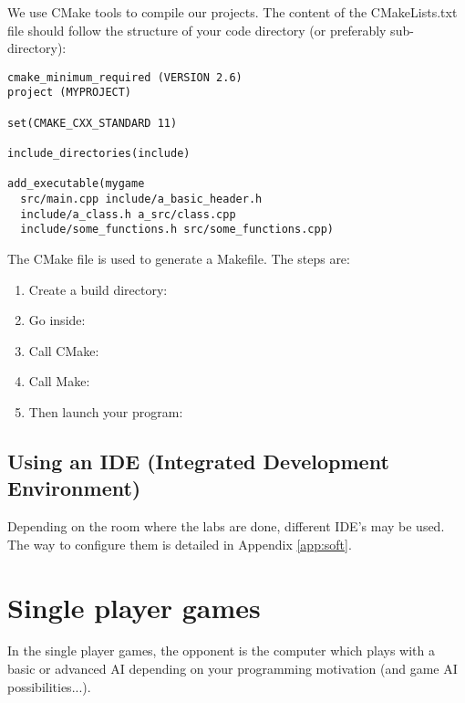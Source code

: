 \documentclass{ecnreport}
\begin{document}
We use CMake tools to compile our projects.
The content of the CMakeLists.txt file should follow the structure of your code directory (or preferably sub-directory):
\begin{center}
\begin{minipage}{.4\linewidth}
\end{minipage}
\begin{minipage}{.55\linewidth}\pythonstyle
\begin{lstlisting}
cmake_minimum_required (VERSION 2.6)
project (MYPROJECT)

set(CMAKE_CXX_STANDARD 11)

include_directories(include)

add_executable(mygame 
  src/main.cpp include/a_basic_header.h
  include/a_class.h a_src/class.cpp
  include/some_functions.h src/some_functions.cpp)
\end{lstlisting} \end{minipage}
\end{center}

The CMake file is used to generate a Makefile. The steps are:
\begin{enumerate}
 \item Create a build directory: 
 \item Go inside: 
 \item Call CMake: 
 \item Call Make: 
 \item Then launch your program: 
\end{enumerate}

\subsection{Using an IDE (Integrated Development Environment)}

Depending on the room where the labs are done, different IDE's may be used. The way to configure them is detailed in Appendix \ref{app:soft}.


\section{Single player games}

In the single player games, the opponent is the computer which plays with a basic or advanced AI depending on your programming
motivation (and game AI possibilities...).
\end{document}
